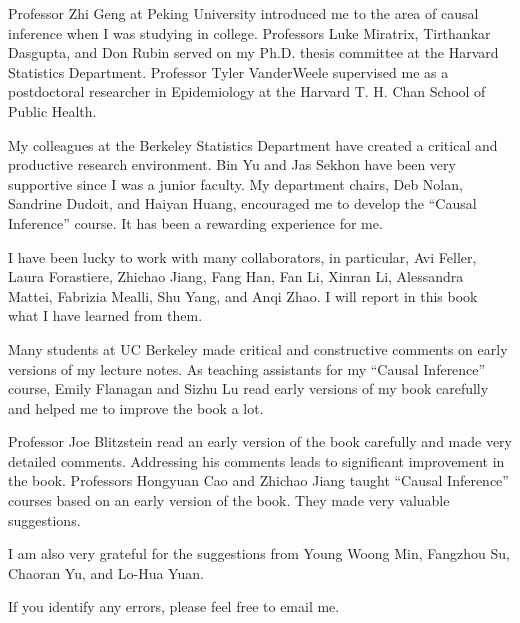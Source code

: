 Professor Zhi Geng at Peking University introduced me to the area of causal inference when I was studying in college. Professors Luke Miratrix, Tirthankar Dasgupta, and Don Rubin served on my Ph.D. thesis committee at the Harvard Statistics Department. Professor Tyler VanderWeele supervised me as a postdoctoral researcher in Epidemiology at the Harvard T. H. Chan School of Public Health.   


My colleagues at the Berkeley Statistics Department have created a critical and productive research environment.  Bin Yu and Jas Sekhon have been very supportive since I was a junior faculty.  My department chairs, Deb Nolan, Sandrine Dudoit, and Haiyan Huang, encouraged me to develop the ``Causal Inference'' course.  It has been a rewarding experience for me.  


I have been lucky to work with many collaborators,  in particular, Avi Feller,  Laura Forastiere, Zhichao Jiang, Fang Han, Fan Li, Xinran Li, Alessandra Mattei, Fabrizia Mealli, Shu Yang, and Anqi Zhao.  I will report in this book what I have learned from them. 


Many students at UC Berkeley made critical and constructive comments on early versions of my lecture notes.  As teaching assistants for my ``Causal Inference'' course,  Emily Flanagan and Sizhu Lu read early versions of my book carefully and helped me to improve the book a lot. 


Professor Joe Blitzstein read an early version of the book carefully and made very detailed comments. Addressing his comments leads to significant improvement in the book.  Professors Hongyuan Cao and Zhichao Jiang taught ``Causal Inference'' courses based on an early version of the book. They made very valuable suggestions. 


I am also very grateful for the suggestions from Young Woong Min, Fangzhou Su, Chaoran Yu, and Lo-Hua Yuan.


If you identify any errors, please feel free to email me.
